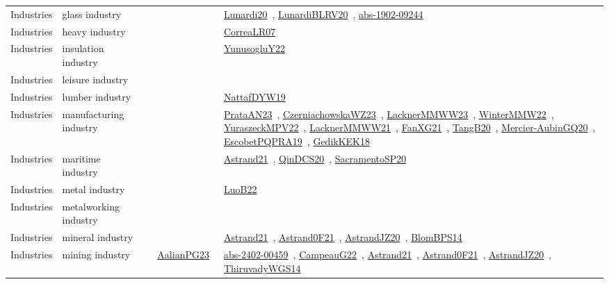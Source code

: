 {\begin{longtable}{lp{3cm}>{\raggedright\arraybackslash}p{6cm}>{\raggedright\arraybackslash}p{6cm}>{\raggedright\arraybackslash}p{8cm}}
Industries & glass industry &  &  & \href{../works/Lunardi20.pdf}{Lunardi20}~\cite{Lunardi20}, \href{../works/LunardiBLRV20.pdf}{LunardiBLRV20}~\cite{LunardiBLRV20}, \href{../works/abs-1902-09244.pdf}{abs-1902-09244}~\cite{abs-1902-09244}\\
Industries & heavy industry &  &  & \href{../works/CorreaLR07.pdf}{CorreaLR07}~\cite{CorreaLR07}\\
Industries & insulation industry &  &  & \href{../works/YunusogluY22.pdf}{YunusogluY22}~\cite{YunusogluY22}\\
Industries & leisure industry &  &  & \\
Industries & lumber industry &  &  & \href{../works/NattafDYW19.pdf}{NattafDYW19}~\cite{NattafDYW19}\\
Industries & manufacturing industry &  &  & \href{../works/PrataAN23.pdf}{PrataAN23}~\cite{PrataAN23}, \href{../works/CzerniachowskaWZ23.pdf}{CzerniachowskaWZ23}~\cite{CzerniachowskaWZ23}, \href{../works/LacknerMMWW23.pdf}{LacknerMMWW23}~\cite{LacknerMMWW23}, \href{../works/WinterMMW22.pdf}{WinterMMW22}~\cite{WinterMMW22}, \href{../works/YuraszeckMPV22.pdf}{YuraszeckMPV22}~\cite{YuraszeckMPV22}, \href{../works/LacknerMMWW21.pdf}{LacknerMMWW21}~\cite{LacknerMMWW21}, \href{../works/FanXG21.pdf}{FanXG21}~\cite{FanXG21}, \href{../works/TangB20.pdf}{TangB20}~\cite{TangB20}, \href{../works/Mercier-AubinGQ20.pdf}{Mercier-AubinGQ20}~\cite{Mercier-AubinGQ20}, \href{../works/EscobetPQPRA19.pdf}{EscobetPQPRA19}~\cite{EscobetPQPRA19}, \href{../works/GedikKEK18.pdf}{GedikKEK18}~\cite{GedikKEK18}\\
Industries & maritime industry &  &  & \href{../works/Astrand21.pdf}{Astrand21}~\cite{Astrand21}, \href{../works/QinDCS20.pdf}{QinDCS20}~\cite{QinDCS20}, \href{../works/SacramentoSP20.pdf}{SacramentoSP20}~\cite{SacramentoSP20}\\
Industries & metal industry &  &  & \href{../works/LuoB22.pdf}{LuoB22}~\cite{LuoB22}\\
Industries & metalworking industry &  &  & \\
Industries & mineral industry &  &  & \href{../works/Astrand21.pdf}{Astrand21}~\cite{Astrand21}, \href{../works/Astrand0F21.pdf}{Astrand0F21}~\cite{Astrand0F21}, \href{../works/AstrandJZ20.pdf}{AstrandJZ20}~\cite{AstrandJZ20}, \href{../works/BlomBPS14.pdf}{BlomBPS14}~\cite{BlomBPS14}\\
Industries & mining industry &  & \href{../works/AalianPG23.pdf}{AalianPG23}~\cite{AalianPG23} & \href{../works/abs-2402-00459.pdf}{abs-2402-00459}~\cite{abs-2402-00459}, \href{../works/CampeauG22.pdf}{CampeauG22}~\cite{CampeauG22}, \href{../works/Astrand21.pdf}{Astrand21}~\cite{Astrand21}, \href{../works/Astrand0F21.pdf}{Astrand0F21}~\cite{Astrand0F21}, \href{../works/AstrandJZ20.pdf}{AstrandJZ20}~\cite{AstrandJZ20}, \href{../works/ThiruvadyWGS14.pdf}{ThiruvadyWGS14}~\cite{ThiruvadyWGS14}\\

\end{longtable}}

